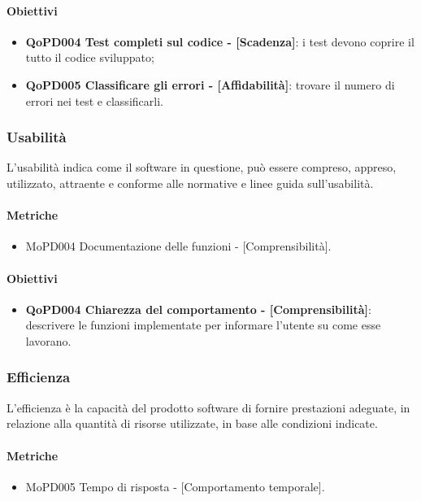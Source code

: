 \documentclass[../piano-di-qualifica.tex]{subfiles}
\begin{document}
\paragraph{Obiettivi}
\label{sub:obiettivi}
\begin{itemize}
    \item \textbf{QoPD004 Test completi sul codice - [Scadenza]}: i test devono coprire il tutto il codice sviluppato;
    \item \textbf{QoPD005 Classificare gli errori - [Affidabilità]}: trovare il numero di errori nei test e classificarli.
\end{itemize}

\subsubsection{Usabilità}%
\label{sub:usabilita}
L'usabilità indica come il software in questione, può essere compreso, appreso, utilizzato, attraente e conforme alle normative e linee guida sull'usabilità.

\paragraph{Metriche}
\label{sub:metriche}
\begin{itemize}
    \item MoPD004 Documentazione delle funzioni - [Comprensibilità].
\end{itemize}

\paragraph{Obiettivi}
\label{sub:obiettivi}
\begin{itemize}
    \item \textbf{QoPD004 Chiarezza del comportamento - [Comprensibilità]}: descrivere le funzioni implementate per informare l'utente su come esse lavorano.
\end{itemize}

\subsubsection{Efficienza}%
\label{sub:efficienza}
L'efficienza è la capacità del prodotto software di fornire prestazioni adeguate, in relazione alla quantità di
risorse utilizzate, in base alle condizioni indicate.

\paragraph{Metriche}
\label{sub:metriche}
\begin{itemize}
    \item MoPD005 Tempo di risposta - [Comportamento temporale].
\end{itemize}
\end{document}
